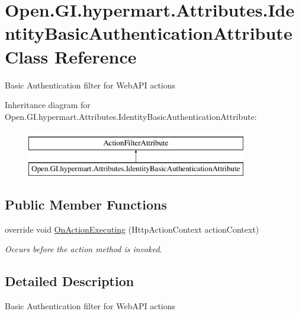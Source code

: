 \hypertarget{class_open_1_1_g_i_1_1hypermart_1_1_attributes_1_1_identity_basic_authentication_attribute}{}\section{Open.\+G\+I.\+hypermart.\+Attributes.\+Identity\+Basic\+Authentication\+Attribute Class Reference}
\label{class_open_1_1_g_i_1_1hypermart_1_1_attributes_1_1_identity_basic_authentication_attribute}


Basic Authentication filter for Web\+A\+PI actions  


Inheritance diagram for Open.\+G\+I.\+hypermart.\+Attributes.\+Identity\+Basic\+Authentication\+Attribute\+:\begin{figure}[H]
\begin{center}
\leavevmode
\includegraphics[height=2.000000cm]{class_open_1_1_g_i_1_1hypermart_1_1_attributes_1_1_identity_basic_authentication_attribute}
\end{center}
\end{figure}
\subsection*{Public Member Functions}
\begin{DoxyCompactItemize}
\item 
override void \hyperlink{class_open_1_1_g_i_1_1hypermart_1_1_attributes_1_1_identity_basic_authentication_attribute_af9c5fb2bfb2694f6c284d6f1ec81fc38}{On\+Action\+Executing} (Http\+Action\+Context action\+Context)
\begin{DoxyCompactList}\small\item\em Occurs before the action method is invoked. \end{DoxyCompactList}\end{DoxyCompactItemize}


\subsection{Detailed Description}
Basic Authentication filter for Web\+A\+PI actions 

